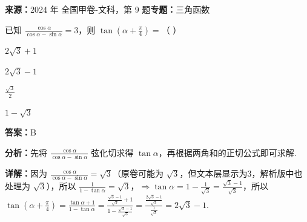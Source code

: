 \begin{question}[points=5]
\textbf{来源：}2024 年 全国甲卷-文科，第 9 题\quad \textbf{专题：}三角函数\par
已知 $\frac{\cos\alpha}{\cos\alpha - \sin\alpha} = 3$，则 $\tan\left(\alpha + \frac{\pi}{4}\right) =$（ ）
\begin{choices}
  \item $2\sqrt{3} + 1$
  \item $2\sqrt{3} - 1$
  \item $\frac{\sqrt{3}}{2}$
  \item $1 - \sqrt{3}$
\end{choices}
\begin{solution}
\textbf{答案：}B

\textbf{分析：}先将 $\frac{\cos\alpha}{\cos\alpha - \sin\alpha}$ 弦化切求得 $\tan\alpha$，再根据两角和的正切公式即可求解.

\textbf{详解：}因为 $\frac{\cos\alpha}{\cos\alpha - \sin\alpha} = \sqrt{3}$（原卷可能为 $\sqrt{3}$，但文本层显示为3，解析版中也处理为 $\sqrt{3}$），所以 $\frac{1}{1 - \tan\alpha} = \sqrt{3}$，$\Rightarrow \tan\alpha = 1 - \frac{1}{\sqrt{3}} = \frac{\sqrt{3} - 1}{\sqrt{3}}$，所以 $\tan\left(\alpha + \frac{\pi}{4}\right) = \frac{\tan\alpha + 1}{1 - \tan\alpha} = \frac{\frac{\sqrt{3} - 1}{\sqrt{3}} + 1}{1 - \frac{\sqrt{3} - 1}{\sqrt{3}}} = \frac{\frac{2\sqrt{3} - 1}{\sqrt{3}}}{\frac{1}{\sqrt{3}}} = 2\sqrt{3} - 1$.
\end{solution}
\end{question}

